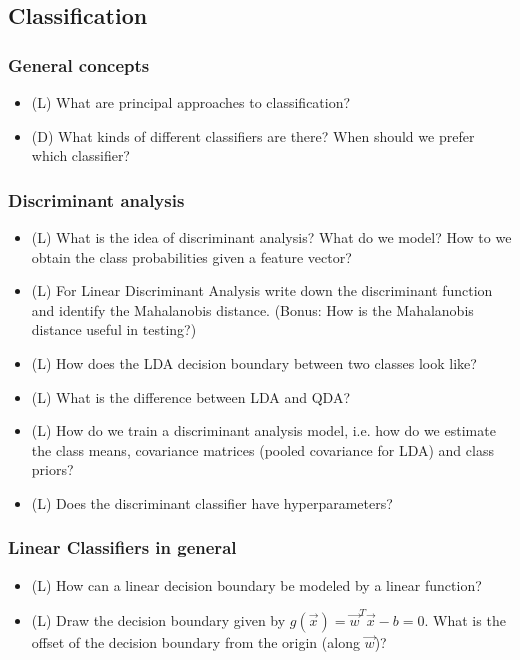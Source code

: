\subsection*{Classification}

\subsubsection*{General concepts}

\begin{itemize}
    \item (L) What are principal approaches to classification?
    \answerboxM
    \item (D) What kinds of different classifiers are there? When should we prefer which classifier?
    \answerboxL
\end{itemize}

\subsubsection*{Discriminant analysis}

\begin{itemize}
    \item (L) What is the idea of discriminant analysis? What do we model? How to we obtain the class probabilities given a feature vector?
    \answerboxM
    \item (L) For Linear Discriminant Analysis write down the discriminant function and identify 
    the Mahalanobis distance. (Bonus: How is the Mahalanobis distance useful in testing?)
    \answerboxM
    \item (L) How does the LDA decision boundary between two classes look like?
    \answerboxM
    \item (L) What is the difference between LDA and QDA?
    \answerboxM
    \item (L) How do we train a discriminant analysis model, i.e. how do we estimate
    the class means, covariance matrices (pooled covariance for LDA) and class priors?
    \answerboxM
    \item (L) Does the discriminant classifier have hyperparameters?
    \answerboxS
\end{itemize}

\subsubsection*{Linear Classifiers in general}
\begin{itemize}
    \item (L) How can a linear decision boundary be modeled by a linear function?
    \answerboxM
    \item (L) Draw the decision boundary given by $g(\vec{x}) = \vec{w}^T \vec{x} - b = 0$. 
    What is the offset of the decision boundary from the origin (along $\vec{w}$)?
    \answerboxM
\end{itemize}

